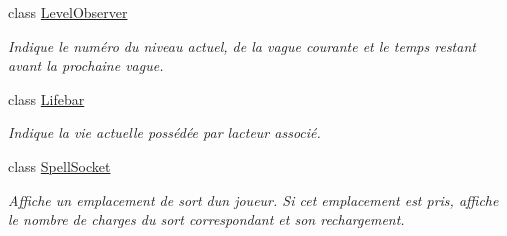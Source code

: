 \begin{DoxyCompactItemize}
class \hyperlink{class_tentacle_slicers_1_1hud_1_1_level_observer}{Level\+Observer}
\begin{DoxyCompactList}\small\item\em Indique le numéro du niveau actuel, de la vague courante et le temps restant avant la prochaine vague. \end{DoxyCompactList}\item 
class \hyperlink{class_tentacle_slicers_1_1hud_1_1_lifebar}{Lifebar}
\begin{DoxyCompactList}\small\item\em Indique la vie actuelle possédée par l\textquotesingle{}acteur associé. \end{DoxyCompactList}\item 
class \hyperlink{class_tentacle_slicers_1_1hud_1_1_spell_socket}{Spell\+Socket}
\begin{DoxyCompactList}\small\item\em Affiche un emplacement de sort d\textquotesingle{}un joueur. Si cet emplacement est pris, affiche le nombre de charges du sort correspondant et son rechargement. \end{DoxyCompactList}\end{DoxyCompactItemize}
